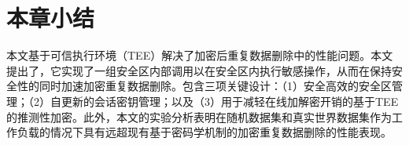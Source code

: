 \section{本章小结}
\label{sec:sgxdedup-sgxdedup-conclusion}

本文基于可信执行环境（TEE）解决了加密后重复数据删除中的性能问题。本文提出了\sysnameS，它实现了一组安全区内部调用以在安全区内执行敏感操作，从而在保持安全性的同时加速加密重复数据删除。\sysnameS 包含三项关键设计：（1）安全高效的安全区管理；（2）自更新的会话密钥管理；以及（3）用于减轻在线加解密开销的基于TEE的推测性加密。此外，本文的实验分析表明\sysnameS 在随机数据集和真实世界数据集作为工作负载的情况下具有远超现有基于密码学机制的加密重复数据删除的性能表现。
